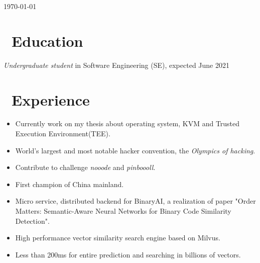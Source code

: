 \documentclass{resume}
\begin{document}
\today



\section{\faGraduationCap\ Education}
\textit{Undergraduate student} in Software Engineering (SE), expected June 2021

\section{\faUsers\ Experience}
\begin{itemize}
    \item Currently work on my thesis about operating system, KVM and Trusted Execution Environment(TEE).
\end{itemize}

\begin{itemize}
    \item World's largest and most notable hacker convention, the \textit{Olympics of hacking}.
    \item Contribute to challenge \textit{nooode} and \textit{pinboooll}.
    \item First champion of China mainland.
\end{itemize}

\begin{itemize}
    \item Micro service, distributed backend for BinaryAI, a realization of paper "Order Matters: Semantic-Aware Neural Networks for Binary Code Similarity Detection".
    \item High performance vector similarity search engine based on Milvus.
    \item Less than 200ms for entire prediction and searching in billions of vectors.
\end{itemize}
\end{document}
